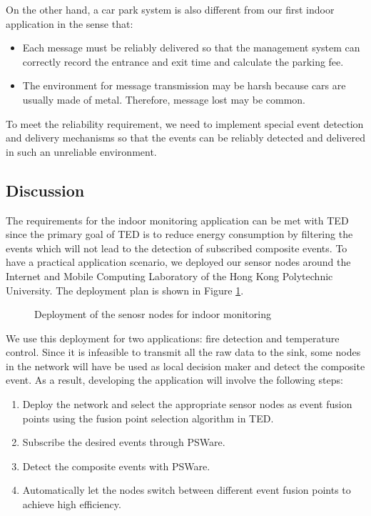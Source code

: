 On the other hand, a car park system is also different from our first indoor application in the sense that:
\begin{itemize}
\item Each message must be reliably delivered so that the management system can correctly record the entrance and exit time and calculate the parking fee.
\item The environment for message transmission may be harsh because cars are usually made of metal. Therefore, message lost may be common.
\end{itemize}
To meet the reliability requirement, we need to implement special event detection and delivery mechanisms so that the events can be reliably detected and delivered in such an unreliable environment.

\subsection{Discussion}
The requirements for the indoor monitoring application can be met with TED since the primary goal of TED is to reduce energy consumption by filtering the events which will not lead to the detection of subscribed composite events. To have a practical application scenario, we deployed our sensor nodes around the Internet and Mobile Computing Laboratory of the Hong Kong Polytechnic University. The deployment plan is shown in Figure \ref{fig:indoorDeployment}.

\begin{figure}
\centering
{}
\caption{Deployment of the senosr nodes for indoor monitoring}
\label{fig:indoorDeployment}
\end{figure}

We use this deployment for two applications: fire detection and temperature control. Since it is infeasible to transmit all the raw data to the sink, some nodes in the network will have be used as local decision maker and detect the composite event. As a result, developing the application will involve the following steps:
\begin{enumerate}
\item Deploy the network and select the appropriate sensor nodes as event fusion points using the fusion point selection algorithm in TED.
\item Subscribe the desired events through PSWare.
\item Detect the composite events with PSWare.
\item Automatically let the nodes switch between different event fusion points to achieve high efficiency.
\end{enumerate}

